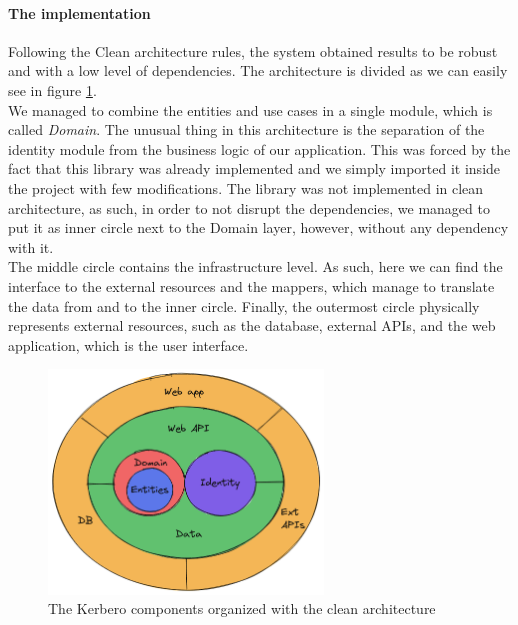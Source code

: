 \paragraph{The implementation}
Following the Clean architecture rules, the system obtained results to be robust and with a low level of dependencies. The architecture is divided as we can easily see in figure \ref{fig:cleanarchitecture}. 
\\ We managed to combine the entities and use cases in a single module, which is called \textit{Domain}. The unusual thing in this architecture is the separation of the identity module from the business logic of our application. This was forced by the fact that this library was already implemented and we simply imported it inside the project with few modifications. The library was not implemented in clean architecture, as such, in order to not disrupt the dependencies, we managed to put it as inner circle next to the Domain layer, however, without any dependency with it. 
\\ The middle circle contains the infrastructure level. As such, here we can find the interface to the external resources and the mappers, which manage to translate the data from and to the inner circle. Finally, the outermost circle physically represents external resources, such as the database, external APIs, and the web application, which is the user interface.
\begin{figure}[ht]
    \centering
    \includegraphics[width=0.65\textwidth]{figures/cleanarchitecture.excalidraw.png}
    \caption{The Kerbero components organized with the clean architecture}
    \label{fig:cleanarchitecture}
\end{figure}

